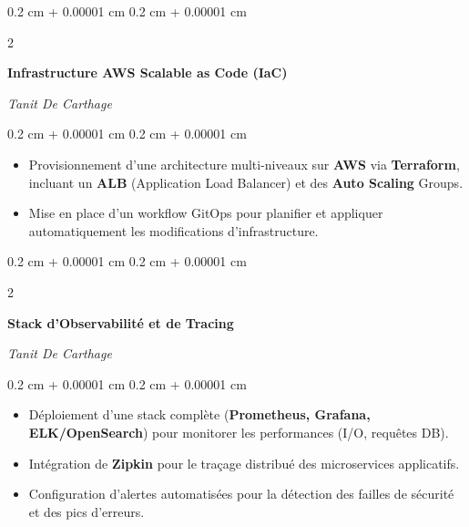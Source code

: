 \documentclass[9pt, letterpaper]{article}
\newenvironment{highlights}{
    \begin{itemize}[
        topsep=0.03 cm,
        parsep=0.03 cm,
        partopsep=0pt,
        itemsep=0pt,
        leftmargin=0.4 cm + 10pt
    ]
}{
    \end{itemize}
}
\newenvironment{onecolentry}{
    \begin{adjustwidth}{
        0.2 cm + 0.00001 cm
    }{
        0.2 cm + 0.00001 cm
    }
}{
    \end{adjustwidth}
}
\newenvironment{twocolentry}[2][]{
    \onecolentry
    \def\secondColumn{#2}
    \setcolumnwidth{\fill, 4.5 cm}
    \begin{paracol}{2}
}{
    \switchcolumn \raggedleft \secondColumn
    \end{paracol}
    \endonecolentry
}
\begin{document}
\vspace{0.15 cm}

\begin{twocolentry}{
    \textit{Tanit De Carthage}}
    \textbf{Infrastructure AWS Scalable as Code (IaC)}
\end{twocolentry}
\begin{onecolentry}
    \begin{highlights}
        \item Provisionnement d'une architecture multi-niveaux sur \textbf{AWS} via \textbf{Terraform}, incluant un \textbf{ALB} (Application Load Balancer) et des \textbf{Auto Scaling} Groups.
        \item Mise en place d'un workflow GitOps pour planifier et appliquer automatiquement les modifications d'infrastructure.
    \end{highlights}
\end{onecolentry}

\vspace{0.15 cm}

\begin{twocolentry}{
    \textit{Tanit De Carthage}}
    \textbf{Stack d'Observabilité et de Tracing}
\end{twocolentry}
\begin{onecolentry}
    \begin{highlights}
        \item Déploiement d'une stack complète (\textbf{Prometheus, Grafana, ELK/OpenSearch}) pour monitorer les performances (I/O, requêtes DB).
        \item Intégration de \textbf{Zipkin} pour le traçage distribué des microservices applicatifs.
        \item Configuration d'alertes automatisées pour la détection des failles de sécurité et des pics d'erreurs.
    \end{highlights}
\end{onecolentry}

\vspace{0.3 cm}
\end{document}
